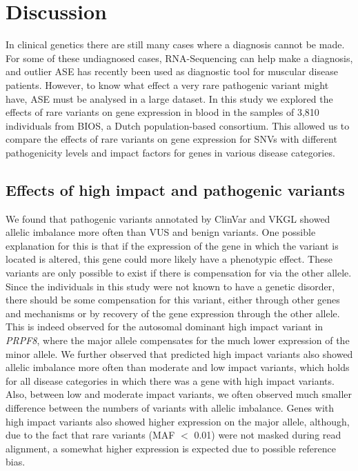 {{\section{Discussion}

In clinical genetics there are still many cases where a diagnosis cannot be made\cite{diemenRapidTargetedGenomics2017b}. For some of these undiagnosed cases, RNA-Sequencing can help make a diagnosis\cite{marco-pucheRNASeqPerspectivesImprove2019}, and outlier ASE has recently been used as diagnostic tool for muscular disease patients\cite{mohammadiGeneticRegulatoryVariation2019}. However, to know what effect a very rare pathogenic variant might have, ASE must be analysed in a large dataset. In this study we explored the effects of rare variants on gene expression in blood in the samples of 3,810 individuals from BIOS, a Dutch population-based consortium. This allowed us to compare the effects of rare variants on gene expression for SNVs with different pathogenicity levels and impact factors for genes in various disease categories.

\subsection{Effects of high impact and pathogenic variants}
We found that pathogenic variants annotated by ClinVar\cite{landrumClinVarImprovingAccess2018} and VKGL\cite{fokkemaDutchGenomeDiagnostic2019} showed allelic imbalance more often than VUS and benign variants. One possible explanation for this is that if the expression of the gene in which the variant is located is altered, this gene could more likely have a phenotypic effect. These variants are only possible to exist if there is compensation for via the other allele. Since the individuals in this study were not known to have a genetic disorder, there should be some compensation for this variant, either through other genes and mechanisms or by recovery of the gene expression through the other allele. This is indeed observed for the autosomal dominant high impact variant in \emph{PRPF8}, where the major allele compensates for the much lower expression of the minor allele. We further observed that predicted high impact variants also showed allelic imbalance more often than moderate and low impact variants, which holds for all disease categories in which there was a gene with high impact variants. Also, between low and moderate impact variants, we often observed much smaller difference between the numbers of variants with allelic imbalance. Genes with high impact variants also showed higher expression on the major allele, although, due to the fact that rare variants (MAF $<$ 0.01) were not masked during read alignment, a somewhat higher expression is expected due to possible reference bias.

}}
